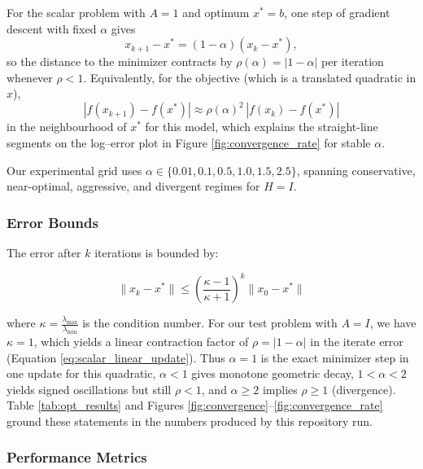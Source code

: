 \documentclass[
]{article}
\begin{document}
For the scalar problem with \(A = 1\) and optimum \(x^\ast = b\), one
step of gradient descent with fixed \(\alpha\) gives \begin{equation}
\label{eq:scalar_linear_update}
x_{k+1} - x^\ast = (1 - \alpha)(x_k - x^\ast),
\end{equation} so the distance to the minimizer contracts by
\(\rho(\alpha) = |1 - \alpha|\) per iteration whenever \(\rho < 1\).
Equivalently, for the objective (which is a translated quadratic in
\(x\)), \begin{equation}
\label{eq:convergence_bound}
|f(x_{k+1}) - f(x^\ast)| \approx \rho(\alpha)^2 \, |f(x_k) - f(x^\ast)|
\end{equation} in the neighbourhood of \(x^\ast\) for this model, which
explains the straight-line segments on the log--error plot in Figure
\ref{fig:convergence_rate} for stable \(\alpha\).

Our experimental grid uses
\(\alpha \in \{0.01, 0.1, 0.5, 1.0, 1.5, 2.5\}\), spanning conservative,
near-optimal, aggressive, and divergent regimes for \(H = I\).

\subsubsection{Error Bounds}\label{error-bounds}

The error after \(k\) iterations is bounded by:

\begin{equation}
\label{eq:error_bound}
\|x_k - x^*\| \leq \left(\frac{\kappa - 1}{\kappa + 1}\right)^k \|x_0 - x^*\|
\end{equation}

where \(\kappa = \frac{\lambda_{\max}}{\lambda_{\min}}\) is the
condition number. For our test problem with \(A = I\), we have
\(\kappa = 1\), which yields a linear contraction factor of
\(\rho = |1 - \alpha|\) in the iterate error (Equation
\ref{eq:scalar_linear_update}). Thus \(\alpha = 1\) is the exact
minimizer step in one update for this quadratic, \(\alpha < 1\) gives
monotone geometric decay, \(1 < \alpha < 2\) yields signed oscillations
but still \(\rho < 1\), and \(\alpha \geq 2\) implies \(\rho \geq 1\)
(divergence). Table \ref{tab:opt_results} and Figures
\ref{fig:convergence}--\ref{fig:convergence_rate} ground these
statements in the numbers produced by this repository run.

\subsubsection{Performance Metrics}\label{performance-metrics}
\end{document}
